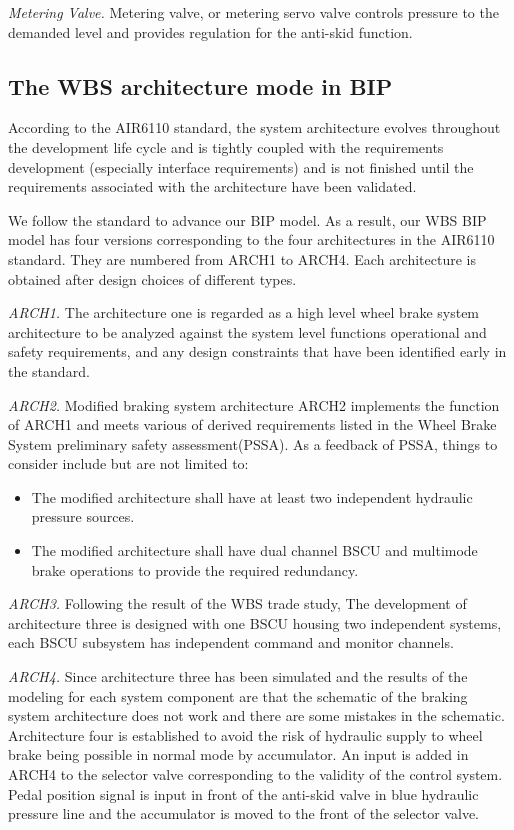 \emph{Metering Valve.} Metering valve, or metering servo valve controls pressure to the demanded level and provides regulation for the anti-skid function.

\subsection{The WBS architecture mode in BIP}

According to the AIR6110 standard, the system architecture evolves throughout the development life cycle and is tightly coupled with the requirements development (especially interface requirements) and is not finished until the requirements associated with the architecture have been validated.

We follow the standard to advance our BIP model. As a result, our WBS BIP model has four versions corresponding to the four architectures in the AIR6110 standard. They are numbered from ARCH1 to ARCH4. Each architecture is obtained after design choices of different types.

\emph{ARCH1.} The architecture one is regarded as a high level wheel brake system architecture to be analyzed against the system level functions operational and safety requirements, and any design constraints that have been identified early in the standard.

\emph{ARCH2.} Modified braking system architecture ARCH2 implements the function of ARCH1 and meets various of derived requirements listed in the Wheel Brake System preliminary safety assessment(PSSA). As a feedback of PSSA, things to consider include but are not limited to:

\begin{itemize}
\item The modified architecture shall have at least two independent hydraulic pressure sources.
\item The modified architecture shall have dual channel BSCU and multimode brake operations to provide the required redundancy.
\end{itemize}

\emph{ARCH3.} Following the result of the WBS trade study, The development of architecture three is designed with one BSCU housing two independent systems, each BSCU subsystem has independent command and monitor channels. 


\emph{ARCH4.} Since architecture three has been simulated and the results of the modeling for each system component are that the schematic of the braking system architecture does not work and there are some mistakes in the schematic. Architecture four is established to avoid the risk of hydraulic supply to wheel brake being possible in normal mode by accumulator. An input is added in ARCH4 to the selector valve corresponding to the validity of the control system. Pedal position signal is input in front of the anti-skid valve in blue hydraulic pressure line and the accumulator is moved to the front of the selector valve.
 